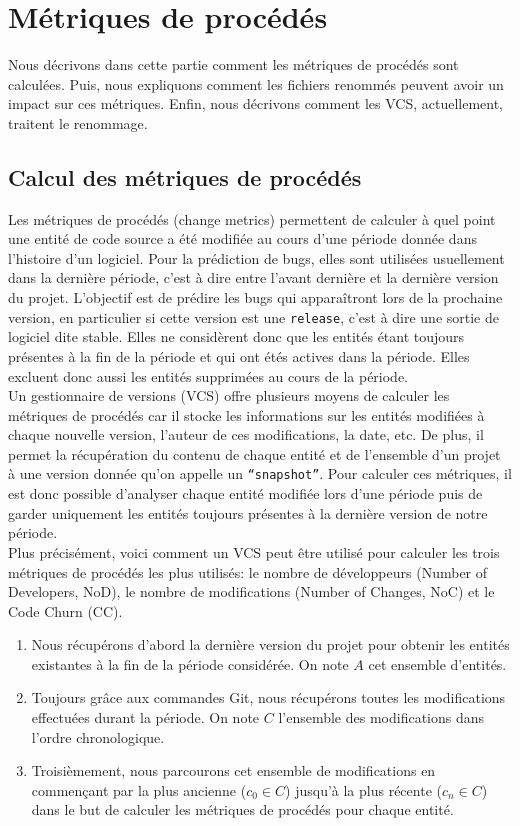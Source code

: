 \section{Métriques de procédés}
\label{sec:metriques}

Nous décrivons dans cette partie comment les métriques de procédés sont calculées. Puis, nous expliquons comment les fichiers renommés peuvent avoir un impact sur ces métriques. Enfin, nous décrivons comment les VCS, actuellement, traitent le renommage.

\subsection{Calcul des métriques de procédés}

Les métriques de procédés (change metrics) permettent de calculer à quel point une entité de code source a été modifiée au cours d'une période donnée dans l'histoire d'un logiciel. Pour la prédiction de bugs, elles sont utilisées usuellement dans la dernière période, c'est à dire entre l'avant dernière et la dernière version du projet. L'objectif est de prédire les bugs qui apparaîtront lors de la prochaine version, en particulier si cette version est une \texttt{release}, c'est à dire une sortie de logiciel dite stable. Elles ne considèrent donc que les entités étant toujours présentes à la fin de la période et qui ont étés actives dans la période. Elles excluent donc aussi les entités supprimées au cours de la période.\\

Un gestionnaire de versions (VCS) offre plusieurs moyens de calculer les métriques de procédés car il stocke les informations sur les entités modifiées à chaque nouvelle version, l'auteur de ces modifications, la date, etc. De plus, il permet la récupération du contenu de chaque entité et de l'ensemble d'un projet à une version donnée qu'on appelle un \texttt{``snapshot''}. Pour calculer ces métriques, il est donc possible d'analyser chaque entité modifiée lors d'une période puis de garder uniquement les entités toujours présentes à la dernière version de notre période.\\

Plus précisément, voici comment un VCS peut être utilisé pour calculer les trois métriques de procédés les plus utilisés: le nombre de développeurs (Number of Developers, NoD), le nombre de modifications  (Number of Changes, NoC) et le Code Churn (CC). 
\begin{enumerate}
\item Nous récupérons d'abord la dernière version du projet pour obtenir les entités existantes à la fin de la période considérée. On note $A$ cet ensemble d'entités.
\item Toujours grâce aux commandes Git, nous récupérons toutes les modifications effectuées durant la période. On note $C$ l'ensemble des modifications dans l'ordre chronologique.
\item Troisièmement, nous parcourons cet ensemble de modifications en commençant par la plus ancienne ($c_0 \in C$) jusqu'à la plus récente ($c_n \in C$) dans le but de calculer les métriques de procédés pour chaque entité.
\end{enumerate}

